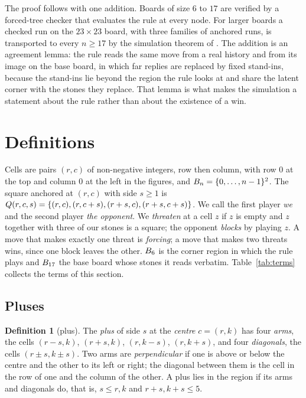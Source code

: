 \documentclass[11pt]{amsart}
\theoremstyle{definition}
\newtheorem{definition}[theorem]{Definition}
\theoremstyle{remark}
\begin{document}
The proof follows \cite{reid-threshold} with one addition. Boards of
size $6$ to $17$ are verified by a forced-tree checker that evaluates
the rule at every node. For larger boards a checked run on the $23
\times 23$ board, with three families of anchored runs, is transported
to every $n \ge 17$ by the simulation theorem of \cite{reid-threshold}.
The addition is an agreement lemma: the rule reads the same move from a
real history and from its image on the base board, in which far replies
are replaced by fixed stand-ins, because the stand-ins lie beyond the
region the rule looks at and share the latent corner with the stones
they replace. That lemma is what makes the simulation a statement about
the rule rather than about the existence of a win.

\section{Definitions}\label{sec:defs}

Cells are pairs $(r,c)$ of non-negative integers, row then column,
with row $0$ at the top and column $0$ at the left in the figures, and
$B_n = \{0,\dots,n-1\}^2$. The square anchored at $(r,c)$ with
side $s \ge 1$ is
$Q(r,c,s) = \{(r,c), (r,c+s), (r+s,c), (r+s,c+s)\}$. We call the
first player \emph{we} and the second player \emph{the opponent}. We
\emph{threaten} at a cell $z$ if $z$ is empty and $z$ together with
three of our stones is a square; the opponent \emph{blocks} by playing
$z$. A move that makes exactly one threat is \emph{forcing}; a move
that makes two threats wins, since one block leaves the other.
$B_6$ is the corner region in which the rule plays and
$B_{17}$ the base board whose stones it reads verbatim.
Table~\ref{tab:terms} collects the terms of this section.

\subsection{Pluses}

\begin{definition}[plus]\label{def:plus}
The \emph{plus} of side $s$ at the \emph{centre} $c = (r,k)$ has four
\emph{arms}, the cells $(r-s,k)$, $(r+s,k)$, $(r,k-s)$, $(r,k+s)$, and
four \emph{diagonals}, the cells $(r \pm s, k \pm s)$. Two arms are
\emph{perpendicular} if one is above or below the centre and the other
to its left or right; the diagonal between them is the cell in the row
of one and the column of the other. A plus lies in the region if its
arms and diagonals do, that is, $s \le r, k$ and $r+s, k+s \le 5$.
\end{definition}
\end{document}
